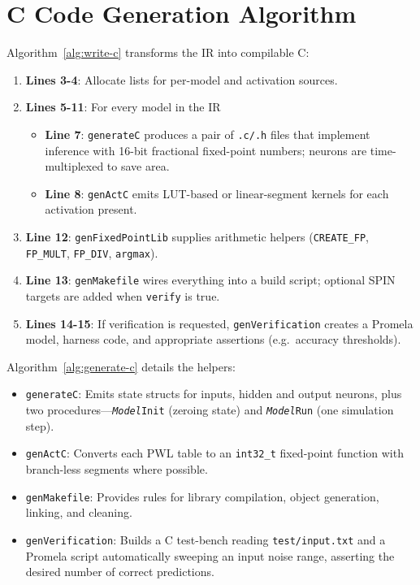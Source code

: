 \section{C Code Generation Algorithm}

Algorithm~\ref{alg:write-c} transforms the IR into compilable C:

\begin{enumerate}
  \item \textbf{Lines 3-4}: Allocate lists for per-model and activation sources.
  \item \textbf{Lines 5-11}: For every model in the IR
        \begin{itemize}
          \item \textbf{Line 7}: \texttt{generateC} produces a pair of \texttt{.c/.h} files that implement inference with 16-bit fractional fixed-point numbers; neurons are time-multiplexed to save area.
          \item \textbf{Line 8}: \texttt{genActC} emits LUT-based or linear-segment kernels for each activation present.
        \end{itemize}
  \item \textbf{Line 12}: \texttt{genFixedPointLib} supplies arithmetic helpers (\texttt{CREATE\_FP}, \texttt{FP\_MULT}, \texttt{FP\_DIV}, \texttt{argmax}).
  \item \textbf{Line 13}: \texttt{genMakefile} wires everything into a build script; optional SPIN targets are added when \texttt{verify} is true.
  \item \textbf{Lines 14-15}: If verification is requested, \texttt{genVerification} creates a Promela model, harness code, and appropriate assertions (e.g.\ accuracy thresholds).
\end{enumerate}

Algorithm~\ref{alg:generate-c} details the helpers:

\begin{itemize}
  \item \texttt{generateC}: Emits state structs for inputs, hidden and output neurons, plus two procedures—\texttt{\emph{Model}Init} (zeroing state) and \texttt{\emph{Model}Run} (one simulation step).
  \item \texttt{genActC}: Converts each PWL table to an \texttt{int32\_t} fixed-point function with branch-less segments where possible.
  \item \texttt{genMakefile}: Provides rules for library compilation, object generation, linking, and cleaning.
  \item \texttt{genVerification}: Builds a C test-bench reading \texttt{test/input.txt} and a Promela script automatically sweeping an input noise range, asserting the desired number of correct predictions.
\end{itemize}

